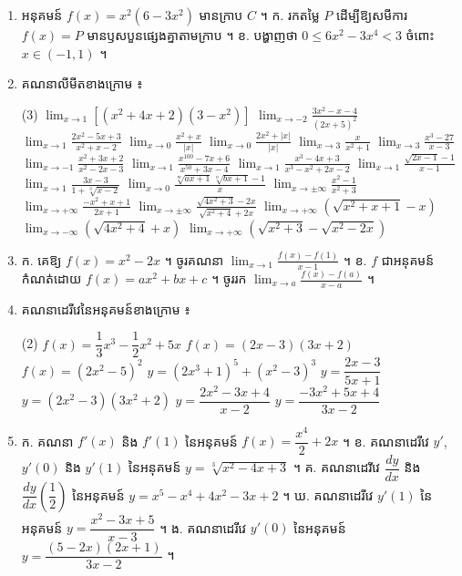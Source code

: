 \begin{enumerate}[1]
  \item អនុគមន៍ $f(x) = x^2(6 - 3x^2)$ មានក្រាប $C$ ។ \quad ក. រកតម្លៃ $P$ ដើម្បីឱ្យសមីការ $f(x) = P$ មានឫសបួនផ្សេងគ្នាតាមក្រាប ។ \quad ខ. បង្ហាញថា $0 \le 6x^2 - 3x^4 < 3$ ចំពោះ $x \in (-1, 1)$ ។
  \item គណនាលីមីតខាងក្រោម ៖
  \begin{tasks}(3)
    \task $\displaystyle\lim_{x \to 1}[(x^2 + 4x + 2)(3 - x^2)]$
    \task $\displaystyle\lim_{x \to -2}\frac{3x^2 - x - 4}{(2x + 5)^2}$
    \task $\displaystyle\lim_{x \to 1}\frac{2x^2 - 5x + 3}{x^2 + x - 2}$
    \task $\displaystyle\lim_{x \to 0}\frac{x^2 + x}{|x|}$
    \task $\displaystyle\lim_{x \to 0}\frac{2x^2 + |x|}{|x|}$
    \task $\displaystyle\lim_{x \to 3}\frac{x}{x^2 + 1}$
    \task $\displaystyle\lim_{x \to 3}\frac{x^3 - 27}{x - 3}$
    \task $\displaystyle\lim_{x \to -1}\frac{x^2 + 3x + 2}{x^2 - 2x - 3}$
    \task $\displaystyle\lim_{x \to 1}\frac{x^{100} - 7x + 6}{x^{50} + 3x - 4}$
    \task $\displaystyle\lim_{x \to 1}\frac{x^3 - 4x + 3}{x^3 - x^2 + 2x - 2}$
    \task $\displaystyle\lim_{x \to 1}\frac{\sqrt{2x - 1} - 1}{x - 1}$
    \task $\displaystyle\lim_{x \to 1}\frac{3x - 3}{1 + \sqrt[3]{x - 2}}$
    \task $\displaystyle\lim_{x \to 0}\frac{\sqrt[m]{ax + 1}\,\sqrt[n]{bx + 1} - 1}{x}$
    \task $\displaystyle\lim_{x \to \pm\infty}\frac{x^2 - 1}{x^2 + 3}$
    \task $\displaystyle\lim_{x \to +\infty}\frac{-x^2 + x + 1}{2x + 1}$
    \task $\displaystyle\lim_{x \to \pm\infty}\frac{\sqrt{4x^2 + 3} - 2x}{\sqrt{x^2 + 4} + 2x}$
    \task $\displaystyle\lim_{x \to +\infty}(\sqrt{x^2 + x + 1} - x)$
    \task $\displaystyle\lim_{x \to -\infty}(\sqrt{4x^2 + 4} + x)$
    \task $\displaystyle\lim_{x \to +\infty}(\sqrt{x^2 + 3} - \sqrt{x^2 - 2x})$
  \end{tasks}
  \item ក. គេឱ្យ $f(x) = x^2 - 2x$ ។ ចូរគណនា $\displaystyle\lim_{x \to 1}\frac{f(x) - f(1)}{x - 1}$ ។ \quad ខ. $f$ ជាអនុគមន៍កំណត់ដោយ $f(x) = ax^2 + bx + c$ ។ ចូររក $\displaystyle\lim_{x \to a}\frac{f(x) - f(a)}{x - a}$ ។
  \item គណនាដេរីវេនៃអនុគមន៍ខាងក្រោម ៖
  \begin{tasks}(2)
    \task $f(x) = \dfrac{1}{3}x^3 - \dfrac{1}{2}x^2 + 5x$
    \task $f(x) = (2x - 3)(3x + 2)$
    \task $f(x) = (2x^2 - 5)^2$
    \task $y = (2x^3 + 1)^5 + (x^2 - 3)^3$
    \task $y = \dfrac{2x - 3}{5x + 1}$
    \task $y = (2x^2 - 3)(3x^2 + 2)$
    \task $y = \dfrac{2x^2 - 3x + 4}{x - 2}$
    \task $y = \dfrac{-3x^2 + 5x + 4}{3x - 2}$
  \end{tasks}
  \item ក. គណនា $f'(x)$ និង $f'(1)$ នៃអនុគមន៍ $f(x) = \dfrac{x^4}{2} + 2x$ ។ \quad ខ. គណនាដេរីវេ $y'$, $y'(0)$ និង $y'(1)$ នៃអនុគមន៍ $y = \sqrt[3]{x^2 - 4x + 3}$ ។ \quad គ. គណនាដេរីវេ $\dfrac{dy}{dx}$ និង $\dfrac{dy}{dx}\left(\dfrac{1}{2}\right)$ នៃអនុគមន៍ $y = x^5 - x^4 + 4x^2 - 3x + 2$ ។ \quad ឃ. គណនាដេរីវេ $y'(1)$ នៃអនុគមន៍ $y = \dfrac{x^2 - 3x + 5}{x - 3}$ ។ \quad ង. គណនាដេរីវេ $y'(0)$ នៃអនុគមន៍ $y = \dfrac{(5 - 2x)(2x + 1)}{3x - 2}$ ។

\end{enumerate}
